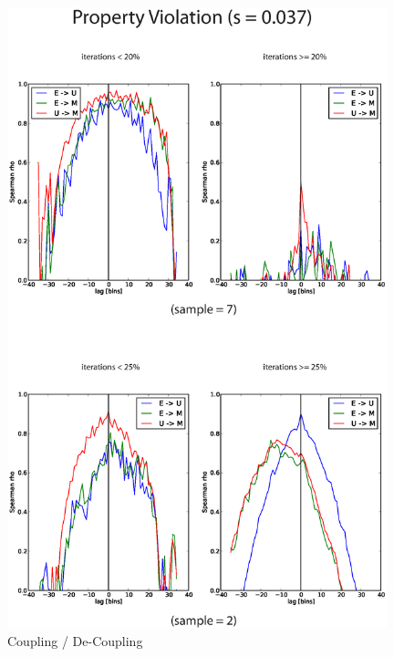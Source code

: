 \begin{figure}[h]
\begin{center}
\centerline{\includegraphics[width=11cm]{../figures2/rankCrossCorr.eps}}
\caption{Coupling / De-Coupling}
\label{fig:crossRankCorr}
\end{center}
\end{figure}






